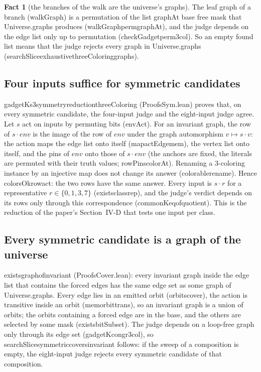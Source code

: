 \documentclass[11pt,a4paper]{article}
\newcommand{\leanus}{\textunderscore\allowbreak}
\newcommand{\lean}[1]{{\ttfamily\let\_\leanus #1}}
\theoremstyle{definition}
\newtheorem{fact}{Fact}
\begin{document}
\begin{fact}[the branches of the walk are the universe's graphs]
The leaf graph of a branch (\lean{walkGraph}) is a permutation of the list
\lean{graphAt base free mask} that \lean{Universe.graphs} produces
(\lean{walkGraph\_perm\_graphAt}), and the judge depends on the edge list
only up to permutation (\lean{checkGadget\_perm\_3col}). So an empty
\lean{found} list means that the judge rejects every graph in
\lean{Universe.graphs}
(\lean{searchSlice\_exhaustive\_threeColoring\_graphs}).
\end{fact}

\subsection{Four inputs suffice for symmetric candidates}\label{sec:symred}
\lean{gadgetK\_s3\_symmetry\_reduction\_threeColoring}
(\lean{ProofsSym.lean}) proves that, on every symmetric candidate, the
four-input judge and the eight-input judge agree. Let $s$ act on inputs by
permuting bits (\lean{envAct}). For an invariant graph, the row of
$s\cdot\mathit{env}$ is the image of the row of $\mathit{env}$ under the
graph automorphism $v\mapsto s\cdot v$: the action maps the edge list onto
itself (\lean{map\_actEdge\_mem}), the vertex list onto itself, and the pins
of $\mathit{env}$ onto those of $s\cdot\mathit{env}$ (the anchors are fixed,
the literals are permuted with their truth values; \lean{rowPins\_colorAt}).
Renaming a 3-coloring instance by an injective map does not change its answer
(\lean{colorable\_rename}). Hence \lean{colorsOk\_row\_act}: the two rows have
the same answer. Every input is $s\cdot r$ for a representative
$r\in\{0,1,3,7\}$ (\lean{exists\_class\_rep}), and the judge's verdict
depends on its rows only through this correspondence
(\lean{commonK\_eq\_of\_quotient}). This is the reduction of the paper's
Section~IV-D that tests one input per class.

\subsection{Every symmetric candidate is a graph of the universe}\label{sec:cover}
\lean{exists\_graph\_of\_invariant} (\lean{ProofsCover.lean}): every
invariant graph inside the edge list that contains the forced edges has the
same edge set as some graph of \lean{Universe.graphs}. Every edge lies in an
emitted orbit (\lean{orbits\_cover}), the action is transitive inside an
orbit (\lean{mem\_orbit\_trans}), so an invariant graph is a union of
orbits; the orbits containing a forced edge are in the base, and the others
are selected by some mask (\lean{exists\_bitSubset}). The judge depends on a
loop-free graph only through its edge set (\lean{gadgetK\_congr\_3col}), so
\lean{searchSlice\_symmetric\_covers\_invariant} follows: if the sweep of a
composition is empty, the eight-input judge rejects every symmetric
candidate of that composition.
\end{document}

